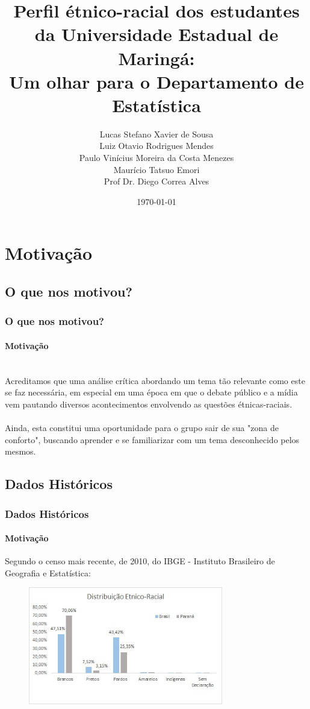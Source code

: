\documentclass{beamer}
\title[Perfil étnico-racial ]{
Perfil étnico-racial dos estudantes da Universidade Estadual de Maringá: \\ Um olhar para o Departamento de Estatística}
\author[A VIDA É BELA!!!]{
  Lucas Stefano Xavier de Sousa\\
  Luiz Otavio Rodrigues Mendes\\
  Paulo Vinícius Moreira da Costa Menezes\\
  Maurício Tatsuo Emori\\\medskip
  {\small {Prof Dr. Diego Correa Alves}
  }}
\institute[Universidade Estadual de Maringá ]{
  Departamento de Estatística - UEM \\}
\date{\today}
\begin{document}
\begin{frame}
  \titlepage
\end{frame}

\section{Motivação}
\subsection{O que nos motivou?}

\begin{frame}
    \frametitle{O que nos motivou?}
    \framesubtitle{Motivação}
    \justifying
    \\
    Acreditamos que uma análise crítica abordando um tema tão relevante como este se faz necessária, em especial em uma época em que o debate público e a mídia vem pautando diversos acontecimentos envolvendo as questões étnicas-raciais.\\
    \\Ainda, esta constitui uma oportunidade para o grupo sair de sua "zona de conforto", buscando aprender e se familiarizar com um tema desconhecido pelos mesmos.
    
\end{frame}

\subsection{Dados Históricos}

\begin{frame}
    \frametitle{Dados Históricos}
    \framesubtitle{Motivação}
    \justifying

    Segundo o censo mais recente, de 2010, do IBGE - Instituto Brasileiro de Geografia e Estatística:
    \begin{figure}
       \centering
       \includegraphics[width=8.5cm]{distribuicao-etnico-racial.jpeg}
   \end{figure}
    
    
\end{frame}
\end{document}
